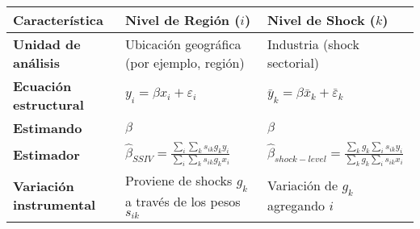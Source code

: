 \begin{tabularx}{\textwidth}{l X X}
\toprule
\textbf{Característica} & \textbf{Nivel de Región ($i$)} & \textbf{Nivel de Shock ($k$)} \\
\midrule
\textbf{Unidad de análisis} & Ubicación geográfica (por ejemplo, región) & Industria (shock sectorial) \\
\textbf{Ecuación estructural} & $y_i = \beta x_i + \varepsilon_i$ & $\bar{y}_k = \beta \bar{x}_k + \bar{\varepsilon}_k$ \\
\textbf{Estimando} & $\beta$ & $\beta$ \\
\textbf{Estimador} & $\hat{\beta}_{SSIV}=\frac{\sum_i\sum_ks_{ik}g_ky_i}{\sum_i\sum_ks_{ik}g_kx_i}$ & $\hat{\beta}_{shock-level}=\frac{\sum_kg_k\sum_is_{ik}y_i}{\sum_kg_k\sum_is_{ik}x_i}$ \\
\textbf{Variación instrumental} & Proviene de shocks $g_k$ a través de los pesos $s_{ik}$ & Variación de $g_k$ agregando $i$   \\
\bottomrule

\end{tabularx}
